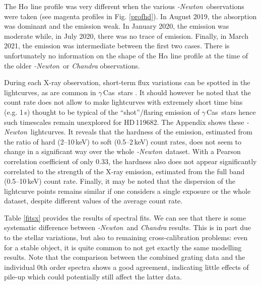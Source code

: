 \documentclass[a4paper,fleqn,usenatbib]{mnras}
\newcommand{\xmm}{{\sc{XMM}}\emph{-Newton}}
\newcommand{\gc}{$\gamma$\,Cas}
\newcommand{\hd}{HD\,119682}
\begin{document}
The H$\alpha$ line profile was very different when the various \xmm\ observations were taken (see magenta profiles in Fig. \ref{profhd}). In August 2019, the absorption was dominant and the emission weak. In January 2020, the emission was moderate while, in July 2020, there was no trace of emission. Finally, in March 2021, the emission was intermediate between the first two cases. There is unfortunately no information on the shape of the H$\alpha$ line profile at the time of the older \xmm\ or {\it Chandra} observations.

During each X-ray observation, short-term flux variations can be spotted in the lightcurves, as are common in \gc\ stars \citep[e.g.][]{smi12}. It should however be noted that the count rate does not allow to make lightcurves with extremely short time bins (e.g. 1\,s) thought to be typical of the ``shot''/flaring emission of \gc\ stars hence such timescales remain unexplored for \hd. The Appendix shows these \xmm\ lightcurves. It reveals that the hardness of the emission, estimated from the ratio of hard (2--10\,keV) to soft (0.5--2\,keV) count rates, does not seem to change in a significant way over the whole \xmm\ dataset. With a Pearson correlation coefficient of only 0.33, the hardness also does not appear significantly correlated to the strength of the X-ray emission, estimated from the full band (0.5--10\,keV) count rate. Finally, it may be noted that the dispersion of the lightcurve points remains similar if one considers a single exposure or the whole dataset, despite different values of the average count rate.

Table \ref{fitsx} provides the results of spectral fits. We can see that there is some systematic difference between \xmm\ and {\it Chandra} results. This is in part due to the stellar variations, but also to remaining cross-calibration problems: even for a stable object, it is quite common to not get exactly the same modelling results. Note that the comparison between the combined grating data and the individual 0th order spectra shows a good agreement, indicating little effects of pile-up which could potentially still affect the latter data.
\end{document}
